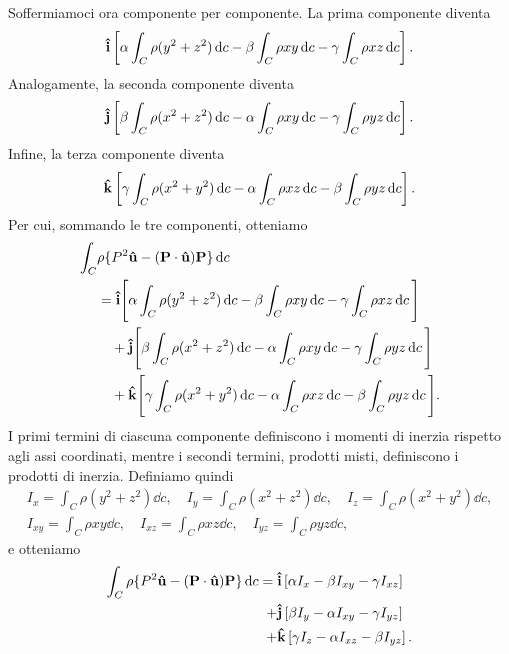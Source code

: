 Soffermiamoci ora componente per componente. La prima componente diventa
\begin{equation*}
    \vu{i}\left[\alpha\int_C \rho(y^2+z^2) \dd{c} -\beta \int_C \rho x y \dd{c} - \gamma \int_C \rho x z \dd{c}\right]. 
\end{equation*}
Analogamente, la seconda componente diventa
\begin{equation*}
    \vu{j}\left[ \beta\int_C \rho(x^2+z^2) \dd{c} -\alpha \int_C \rho x y \dd{c} - \gamma \int_C \rho y z \dd{c}\right].
\end{equation*}
Infine, la terza componente diventa
\begin{equation*}
    \vu{k}\left[ \gamma\int_C \rho(x^2+y^2) \dd{c} -\alpha \int_C \rho x z \dd{c} - \beta \int_C \rho y z \dd{c}\right].
\end{equation*}
Per cui, sommando le tre componenti, otteniamo
\begin{align*}
    \int_C &\rho\{ P^2\vu{u} - (\vb{P}\cdot\vu{u})\vb{P} \}\dd{c} \\
        &= \vu{i}\Bigg[\alpha\int_C \rho(y^2+z^2) \dd{c} -\beta \int_C \rho x y \dd{c} - \gamma \int_C \rho x z \dd{c}\Bigg] \\
        &\quad + \vu{j}\Bigg[ \beta\int_C \rho(x^2+z^2) \dd{c} -\alpha \int_C \rho x y \dd{c} - \gamma \int_C \rho y z \dd{c}\Bigg] \\
        &\quad + \vu{k}\Bigg[ \gamma\int_C \rho(x^2+y^2) \dd{c} -\alpha \int_C \rho x z \dd{c} - \beta \int_C \rho y z \dd{c}\Bigg].
\end{align*}
I primi termini di ciascuna componente definiscono i momenti di inerzia rispetto agli assi coordinati, mentre i secondi termini, prodotti misti, definiscono i prodotti di inerzia. Definiamo quindi
\begin{gather*}
    I_{x} = \int_C \rho(y^2+z^2) \dd{c}, \quad I_{y} = \int_C \rho(x^2+z^2) \dd{c}, \quad I_{z} = \int_C \rho(x^2+y^2) \dd{c}, \\
    I_{xy} = \int_C \rho x y \dd{c}, \quad I_{xz} = \int_C \rho x z \dd{c}, \quad I_{yz} = \int_C \rho y z \dd{c},
\end{gather*}
e otteniamo
\begin{align*}
    \int_C \rho\{ P^2\vu{u} - (\vb{P}\cdot\vu{u})\vb{P} \}\dd{c}
    ={}&\vu{i}\left[\alpha I_{x} -\beta I_{xy} - \gamma I_{xz}\right] \\
    + &\vu{j}\left[ \beta I_{y} -\alpha I_{xy} - \gamma I_{yz}\right] \\
    + &\vu{k}\left[ \gamma I_{z} -\alpha I_{xz} - \beta I_{yz}\right].
\end{align*}

